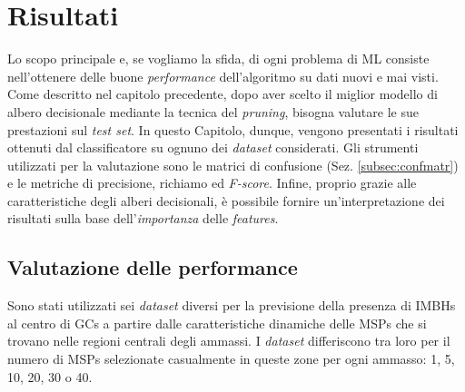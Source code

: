 \chapter{Risultati}
\label{chap:cap4}
Lo scopo principale e, se vogliamo la sfida, di ogni problema di ML consiste nell'ottenere delle buone \textit{performance} dell'algoritmo su dati nuovi e mai visti. Come descritto nel capitolo precedente, dopo aver scelto il miglior modello di albero decisionale mediante la tecnica del \textit{pruning}, bisogna valutare le sue prestazioni sul \textit{test set}. In questo Capitolo, dunque, vengono presentati i risultati ottenuti dal classificatore su ognuno dei \textit{dataset} considerati. Gli strumenti utilizzati per la valutazione sono le matrici di confusione (Sez. \ref{subsec:confmatr}) e le metriche di precisione, richiamo ed \textit{F-score}. Infine, proprio grazie alle caratteristiche degli alberi decisionali, è possibile fornire un'interpretazione dei risultati sulla base dell'\textit{importanza} delle \textit{features}.

\section{Valutazione delle performance}
Sono stati utilizzati sei \textit{dataset} diversi per la previsione della presenza di IMBHs al centro di GCs a partire dalle caratteristiche dinamiche delle MSPs che si trovano nelle regioni centrali degli ammassi. I \textit{dataset} differiscono tra loro per il numero di MSPs selezionate casualmente in queste zone per ogni ammasso: 1, 5, 10, 20, 30 o 40.

